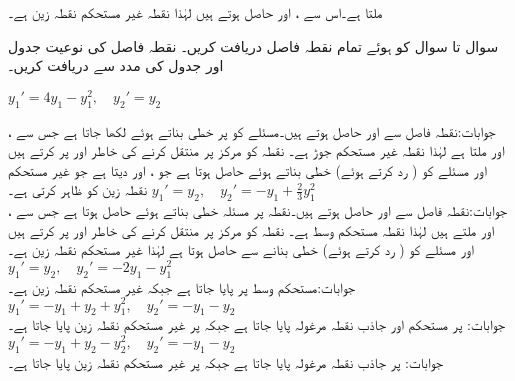 ملتا ہے۔اس سے ،  اور  حاصل ہوتے ہیں لہٰذا نقطہ  غیر مستحکم نقطہ زین ہے۔

سوال  تا سوال  کو  ہوئے تمام نقطہ فاصل دریافت کریں۔ نقطہ فاصل کی نوعیت جدول  اور جدول  کی مدد سے دریافت کریں۔

\quad 
$y_1'=4y_1-y_1^2,\quad y_2'=y_2$

جوابات:نقطہ فاصل  سے  اور  حاصل ہوتے ہیں۔مسئلے کو  پر خطی بناتے ہوئے  لکھا جاتا ہے جس سے ،  اور  ملتا ہے لہٰذا نقطہ  غیر مستحکم جوڑ ہے۔ نقطہ  کو مرکز پر منتقل کرنے کی خاطر  اور  پر کرتے ہیں اور مسئلے کو ( رد کرتے ہوئے) خطی بناتے ہوئے  حاصل ہوتا ہے جو ،  اور  دیتا ہے  جو غیر مستحکم نقطہ زین کو ظاہر کرتی ہے۔
\quad 
$y_1'=y_2,\quad y_2'=-y_1+\frac{2}{3}y_1^2$\\
جوابات:نقطہ فاصل  سے  اور  حاصل ہوتے ہیں۔نقطہ  پر مسئلہ خطی بناتے ہوئے  حاصل ہوتا ہے جس سے ،  اور  ملتے ہیں لہٰذا نقطہ  مستحکم وسط ہے۔ نقطہ  کو مرکز پر منتقل کرنے کی خاطر  اور  پر کرتے ہیں اور  مسئلے کو ( رد کرتے ہوئے) خطی بنانے سے   حاصل ہوتا ہے لہٰذا  غیر مستحکم نقطہ زین ہے۔
\quad 
$y_1'=y_2,\quad y_2'=-2y_1-y_1^2$\\
جوابات:مستحکم وسط  پر پایا جاتا ہے جبکہ  غیر مستحکم نقطہ زین  ہے۔
\quad 
$y_1'=-y_1+y_2+y_1^2,\quad y_2'=-y_1-y_2$\\
جوابات: پر مستحکم اور جاذب نقطہ مرغولہ پایا جاتا ہے جبکہ  پر غیر مستحکم نقطہ زین پایا جاتا ہے۔
\quad 
$y_1'=-y_1+y_2-y_2^2,\quad y_2'=-y_1-y_2$\\
جوابات: پر جاذب  نقطہ مرغولہ  پایا جاتا ہے جبکہ  پر غیر مستحکم نقطہ زین پایا جاتا ہے۔

